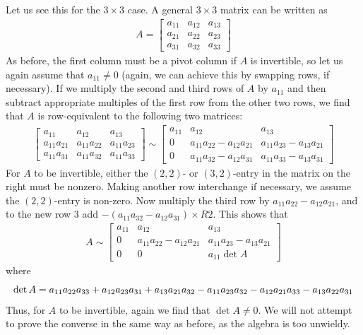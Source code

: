 \documentclass[12pt,letterpaper,reqno]{article}
\numberwithin{equation}{section}
\begin{document}
Let us see this for the $3 \times 3$ case. A general $3 \times 3$ matrix can be written as 
\begin{align*}
	A=\begin{bmatrix}
		a_{11} & a_{12} & a_{13} \\
		a_{21} & a_{22} & a_{23} \\
		a_{31} & a_{32} & a_{33}
	\end{bmatrix}
\end{align*}
As before, the first column must be a pivot column if $A$ is invertible, so let us again assume that $a_{11} \neq 0$ (again, we can achieve this by swapping rows, if necessary). If we multiply the second and third rows of $A$ by $a_{11}$ and then subtract appropriate multiples of the first row from the other two rows, we find that $A$ is row-equivalent to the following two matrices:
\begin{align*}
	\begin{bmatrix}
		a_{11} & a_{12} & a_{13} \\
		a_{11}a_{21} & a_{11}a_{22} & a_{11}a_{23} \\
		a_{11}a_{31} & a_{11}a_{32} & a_{11}a_{33} 
	\end{bmatrix} \sim \begin{bmatrix}
		a_{11} & a_{12} & a_{13} \\
		0 & a_{11}a_{22}-a_{12}a_{21} & a_{11}a_{23}-a_{13}a_{21} \\
		0 & a_{11}a_{32}-a_{12}a_{31} & a_{11}a_{33}-a_{13}a_{31}
	\end{bmatrix}
\end{align*}
For $A$ to be invertible, either the $(2,2)$- or $(3,2)$-entry in the matrix on the right must be nonzero. Making another row interchange if necessary, we assume the $(2,2)$-entry is non-zero. Now multiply the third row by $a_{11}a_{22}-a_{12}a_{21}$, and to the new row 3 add $-(a_{11}a_{32}-a_{12}a_{31}) \times R2$. This shows that 
\begin{align*}
	A \sim \begin{bmatrix}
		a_{11} & a_{12} & a_{13} \\
		0 & a_{11}a_{22}-a_{12}a_{21} & a_{11}a_{23}-a_{13}a_{21} \\
		0 & 0 & a_{11}\det A
	\end{bmatrix}
\end{align*}
where
\begin{equation}\label{eq:det_3_by_3}
	\det A=a_{11}a_{22}a_{33}+a_{12}a_{23}a_{31}+a_{13}a_{21}a_{32}-a_{11}a_{23}a_{32}-a_{12}a_{21}a_{33}-a_{13}a_{22}a_{31} \\
\end{equation}
Thus, for $A$ to be invertible, again we find that $\det A \neq 0$. We will not attempt to prove the converse in the same way as before, as the algebra is too unwieldy. 
\end{document}
